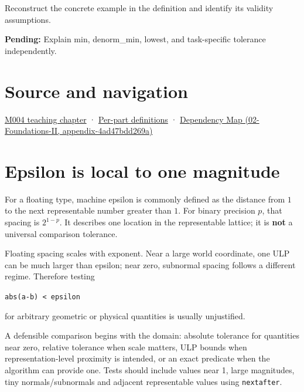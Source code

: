 Reconstruct the concrete example in the definition and identify its validity assumptions.

\textbf{Pending:} Explain min, denorm\_min, lowest, and task-specific tolerance independently.

\section{Source and navigation}\label{appendix-390ea641da54-source-and-navigation}

\href{Continuous\%20Notes/Computing\%20Foundations\%20-\%20From\%20Bits\%20to\%20C++\%20and\%20Systems\%20APIs\#A\%20stretching\%20ruler\%20for\%20real-valued\%20quantities}{M004 teaching chapter} · \hyperref[appendix-fd090d982a15-m004---parts-61-76]{Per-part definitions} · \href{../02-Foundations-II/main.pdf\#nameddest=appendix-4ad47bdd269a}{Dependency Map (02-Foundations-II, appendix-4ad47bdd269a)}

\section{Epsilon is local to one magnitude}\label{appendix-390ea641da54-epsilon-is-local-to-one-magnitude}

For a floating type, machine epsilon is commonly defined as the distance from \(1\) to the next representable number greater than \(1\). For binary precision \(p\), that spacing is \(2^{1-p}\). It describes one location in the representable lattice; it is \textbf{not} a universal comparison tolerance.

Floating spacing scales with exponent. Near a large world coordinate, one ULP can be much larger than epsilon; near zero, subnormal spacing follows a different regime. Therefore testing

\texttt{abs(a-b)\ \textless{}\ epsilon}

for arbitrary geometric or physical quantities is usually unjustified.

A defensible comparison begins with the domain: absolute tolerance for quantities near zero, relative tolerance when scale matters, ULP bounds when representation-level proximity is intended, or an exact predicate when the algorithm can provide one. Tests should include values near 1, large magnitudes, tiny normals/subnormals and adjacent representable values using \texttt{nextafter}.
